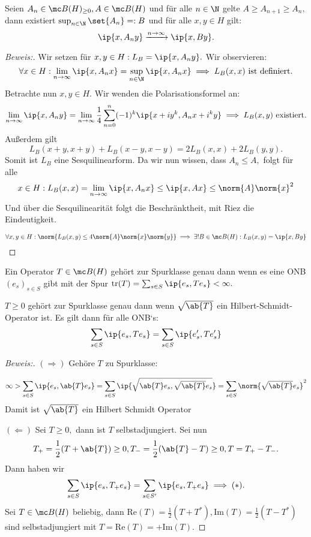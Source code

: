 \begin{theorem} Seien $A_n \in \mc B(H)_{\geq 0}, A \in \mc B(H)$ und für alle $n \in \N$ gelte $A \geq A_{n+1} \geq A_n,$ dann existiert $\sup_{n\in \N}\set{A_n} =: B$ und für alle $x, y \in H$ gilt: \[\ip{x, A_n y} \xrightarrow{n \to \infty} \ip{x, By}.\]
	
	
	\begin{proof}[Beweis:] Wir setzen für $x, y \in H: L_B = \ip{ x, A_ny}.$ Wir observieren: \[\forall x \in H: \lim_{n \to \infty} \ip{x, A_nx} = \sup_{n \in \N}{\ip{x, A_nx}} \implies L_B(x,x) \text{ ist definiert.}\] Betrachte nun $x, y \in H.$ Wir wenden die Polarisationsformel an: \[\lim_{n \to \infty} \ip{x, A_n y} = \lim_{n \to \infty} \frac{1}{4} \sum^n_{n = 0}(-1)^k \ip{x+iy^k, A_n x + i^k y} \implies L_B(x, y) \text{ existiert.}\] Außerdem gilt \[L_B(x+y, x+y) + L_B(x - y, x-y) = 2L_B(x, x) + 2L_B(y, y).\] Somit ist $L_B$ eine Sesquilinearform. Da wir nun wissen, dass $A_n \leq A,$ folgt für alle \[x \in H: L_B(x, x) = \lim_{n \to \infty} \ip{x, A_nx} \leq \ip{x, Ax} \leq \norm{A} \norm{x}^2\] Und über die Sesquilinearität folgt die Beschränktheit, mit Riez die Eindeutigkeit.
		
		\[\forall x, y \in H: \norm{L_B(x, y) \leq 4 \norm{A} \norm{x} \norm{y}} \implies \exists ! B \in \mc B(H): L_B(x, y) = \ip{x, By}\]
		
	\end{proof}
	
\end{theorem}


\begin{definition} Ein Operator $T \in \mc B(H)$ gehört zur Spurklasse genau dann wenn es eine ONB $(e_s)_{s \in S}$ gibt mit der Spur $\text{tr}(T) = \sum_{s \in S} \ip{e_s, Te_s} < \infty.$
	
\end{definition}


\begin{theorem} $T \geq 0$ gehört zur Spurklasse genau dann wenn $\sqrt{\ab{T}}$ ein Hilbert-Schmidt-Operator ist. Es gilt dann für alle ONB‘s: \[\sum_{s \in S} \ip{e_s, Te_s} = \sum_{s \in S} \ip{e_s', Te_s'}\]
	
	
	\begin{proof}[Beweis:] $(\Rightarrow)$ Gehöre $T$ zu Spurklasse:
		
	\[ \infty > \sum_{s \in S} \ip{e_s, \ab{T} e_s} = \sum_{s \in S} \ip{\sqrt{\ab{T}e_s, \sqrt{\ab{T}}e_s}} = \sum_{s \in S} \norm{\sqrt{\ab{T}}e_s}^2\] Damit ist $\sqrt{\ab{T}}$  ein Hilbert Schmidt Operator
			
	$(\Leftarrow)$ Sei $T \geq 0,$ dann ist $T$ selbstadjungiert. Sei nun \[T_+ = \frac{1}{2}(T + \ab{T}) \geq 0, T_- = \frac{1}{2}(\ab{T}- T) \geq 0, T = T_+ - T_-.\] Dann haben wir \[\sum_{s \in S} \ip{e_s, T_+e_s} = \sum_{s \in S'} \ip{e_s, T_+ e_s} \implies (*).\] Sei $T \in \mc B(H)$ beliebig, dann $\text{Re}(T) = \frac{1}{2} (T + T^*), \text{Im}(T) = \frac{1}{2}(T-T^*)$ sind selbstadjungiert mit $T = \text{Re}(T)= + \text{Im}(T).$ 
	\end{proof}
\end{theorem}

